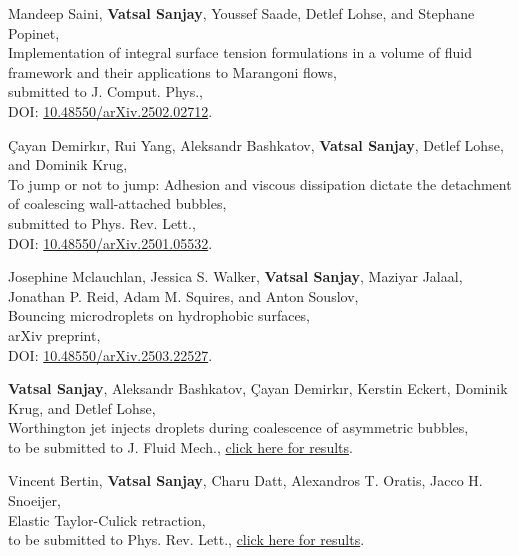 \documentclass[10pt,a4paper,colorlinks,linkcolor=blue,urlcolor=blue,citecolor=blue]{moderncv}
\begin{document}
\begin{enumerate}[leftmargin=1.5em,label=\textbf{[\arabic*]}]
	\item Mandeep Saini, \textbf{Vatsal Sanjay}, Youssef Saade, Detlef Lohse, and Stephane Popinet,\\
	Implementation of integral surface tension formulations in a volume of fluid framework and their applications to Marangoni flows,\\
	submitted to J. Comput. Phys.,\\
	\faFile\hspace{0.2em}DOI: \href{https://doi.org/10.48550/arXiv.2502.02712}{10.48550/arXiv.2502.02712}.

	\item Çayan Demirkır, Rui Yang, Aleksandr Bashkatov, \textbf{Vatsal Sanjay}, Detlef Lohse, and Dominik Krug,\\
	To jump or not to jump: Adhesion and viscous dissipation dictate the detachment of coalescing wall-attached bubbles,\\
	submitted to Phys. Rev. Lett.,\\
	\faFile\hspace{0.2em}DOI: \href{https://doi.org/10.48550/arXiv.2501.05532}{10.48550/arXiv.2501.05532}.

	\item Josephine Mclauchlan, Jessica S. Walker, \textbf{Vatsal Sanjay}, Maziyar Jalaal, Jonathan P. Reid, Adam M. Squires, and Anton Souslov,\\
	Bouncing microdroplets on hydrophobic surfaces,\\
	arXiv preprint,\\
	\faFile\hspace{0.2em}DOI: \href{https://doi.org/10.48550/arXiv.2503.22527}{10.48550/arXiv.2503.22527}.

	\item \textbf{Vatsal Sanjay}, Aleksandr Bashkatov, Çayan Demirkır, Kerstin Eckert, Dominik Krug, and Detlef Lohse,\\
	Worthington jet injects droplets during coalescence of asymmetric bubbles,\\
	to be submitted to J. Fluid Mech., \href{https://youtu.be/WZonMHzzkXQ}{click here for results}.

	\item Vincent Bertin, \textbf{Vatsal Sanjay}, Charu Datt, Alexandros T. Oratis, Jacco H. Snoeijer,\\
	Elastic Taylor-Culick retraction,\\
	to be submitted to Phys. Rev. Lett., \href{https://tinyurl.com/2cvo89bd}{click here for results}.


\end{enumerate}
\end{document}
